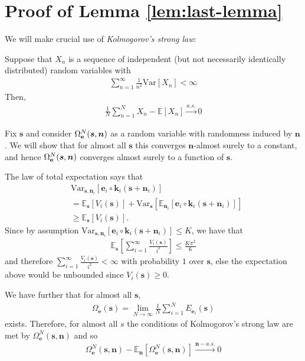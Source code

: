 


\section{Proof of Lemma \ref{lem:last-lemma}}
\label{appendix:last-lemma}


We will make crucial use of \emph{Kolmogorov's strong law}:
\begin{theorem}
	Suppose that $X_n$ is a sequence of independent (but not necessarily identically distributed) random variables with
	\begin{align*}
	\sum_{n=1}^\infty \frac{1}{n^2}\mathrm{Var} [X_n] < \infty
	\end{align*}
	Then,
	\begin{align*}
	\frac{1}{N}\sum_{n=1}^N X_n - \mathbb{E}[X_n] \overset{a.s.}{\longrightarrow} 0
	\end{align*}
\end{theorem}

Fix $\bm{s}$ and consider $\Omega_{\mathbf{e}}^N(\bm{s}, \bm{n})$ as a random variable with randomness induced by $\bm{n}$.
We will show that for almost all $\bm{s}$ this converges $\bm{n}$-almost surely to a constant, and hence $\Omega_{\mathbf{e}}^N(\bm{s}, \bm{n})$ converges almost surely to a function of $\bm{s}$.

The law of total expectation says that
\begin{align*}
&\mathrm{Var}_{\bm{s}, \bm{n}_i} [\bm{e}_i\circ \bm{k}_i(\bm{s} + \bm{n}_i)] \\
&= \mathbb{E}_{\bm{s}}\left[ V_i(\bm{s}) \right] + \mathrm{Var}_{\bm{s}}\left[ \mathbb{E}_{\bm{n}_i} [\bm{e}_i\circ \bm{k}_i( \bm{s} + \bm{n}_i)] \right] \\
& \geq \mathbb{E}_{\bm{s}}\left[ V_i(\bm{s}) \right].
\end{align*}
Since by assumption $\mathrm{Var}_{\bm{s}, \bm{n}_i} [\bm{e}_i\circ \bm{k}_i(\bm{s} + \bm{n}_i)] \leq K$, we have that
\begin{align*}
\mathbb{E}_{\bm{s}}\left[ \sum_{i=1}^\infty  \frac{V_i(\bm{s})}{i^2} \right] \leq \frac{ K \pi^2}{6}
\end{align*}
and therefore  $\sum_{i=1}^\infty  \frac{V_i(\bm{s})}{i^2} < \infty$ with probability $1$ over $\bm{s}$, else the expectation above would be unbounded since $V_i(\bm{s})\geq 0$.

We have further that for almost all $\bm{s}$,
\begin{align*}
\Omega_{\bm{e}}(\bm{s}) = \lim_{N\to\infty}\frac{1}{N}\sum_{i=1}^N E_{\bm{e}_i}(\bm{s})
\end{align*}
exists.
Therefore, for almost all $s$ the conditions of Kolmogorov's strong law are met by $\Omega_{\bm{e}}^N(\bm{s}, \bm{n})$ and so
\begin{align*}
\Omega_{\bm{e}}^N(\bm{s}, \bm{n}) - \mathbb{E}_{\bm{n}}[\Omega_{\bm{e}}^N(\bm{s}, \bm{n})] \overset{\bm{n}-a.s.}{\longrightarrow} 0
\end{align*}

